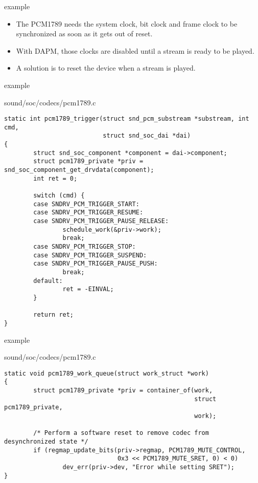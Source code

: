 \begin{frame}{ example}
  \begin{itemize}
  \item The PCM1789 needs the system clock, bit clock and frame clock
    to be synchronized as soon as it gets out of reset.
  \item With DAPM, those clocks are disabled until a stream is ready
    to be played.
  \item A solution is to reset the device when a stream is played.
  \end{itemize}
\end{frame}

\begin{frame}[fragile]{ example}
  \begin{block}{sound/soc/codecs/pcm1789.c}
    \fontsize{8}{8}\selectfont
    \begin{verbatim}
static int pcm1789_trigger(struct snd_pcm_substream *substream, int cmd,
                           struct snd_soc_dai *dai)
{
        struct snd_soc_component *component = dai->component;
        struct pcm1789_private *priv = snd_soc_component_get_drvdata(component);
        int ret = 0;

        switch (cmd) {
        case SNDRV_PCM_TRIGGER_START:
        case SNDRV_PCM_TRIGGER_RESUME:
        case SNDRV_PCM_TRIGGER_PAUSE_RELEASE:
                schedule_work(&priv->work);
                break;
        case SNDRV_PCM_TRIGGER_STOP:
        case SNDRV_PCM_TRIGGER_SUSPEND:
        case SNDRV_PCM_TRIGGER_PAUSE_PUSH:
                break;
        default:
                ret = -EINVAL;
        }

        return ret;
}
    \end{verbatim}
  \end{block}
\end{frame}

\begin{frame}[fragile]{ example}
  \begin{block}{sound/soc/codecs/pcm1789.c}
    \fontsize{8}{8}\selectfont
    \begin{verbatim}
static void pcm1789_work_queue(struct work_struct *work)
{
        struct pcm1789_private *priv = container_of(work,
                                                    struct pcm1789_private,
                                                    work);

        /* Perform a software reset to remove codec from desynchronized state */
        if (regmap_update_bits(priv->regmap, PCM1789_MUTE_CONTROL,
                               0x3 << PCM1789_MUTE_SRET, 0) < 0)
                dev_err(priv->dev, "Error while setting SRET");
}
    \end{verbatim}
  \end{block}
\end{frame}


